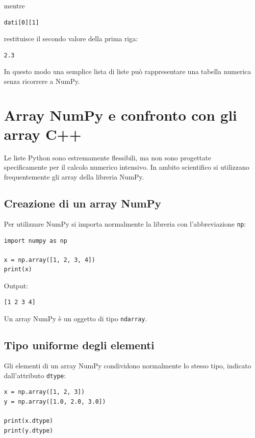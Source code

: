 \documentclass[11pt,a4paper]{book}
\begin{document}
mentre

\begin{lstlisting}[style=python]
dati[0][1]
\end{lstlisting}

restituisce il secondo valore della prima riga:

\begin{lstlisting}[style=output]
2.3
\end{lstlisting}

In questo modo una semplice lista di liste può rappresentare una tabella numerica senza ricorrere a NumPy.


\section{Array NumPy e confronto con gli array C++}

Le liste Python sono estremamente flessibili, ma non sono progettate specificamente per il calcolo numerico intensivo. In ambito scientifico si utilizzano frequentemente gli array della libreria NumPy.

\subsection{Creazione di un array NumPy}

Per utilizzare NumPy si importa normalmente la libreria con l'abbreviazione \texttt{np}:

\begin{lstlisting}[style=python]
import numpy as np

x = np.array([1, 2, 3, 4])
print(x)
\end{lstlisting}

Output:

\begin{lstlisting}[style=python, numbers=none]
[1 2 3 4]
\end{lstlisting}

Un array NumPy è un oggetto di tipo \texttt{ndarray}.

\subsection{Tipo uniforme degli elementi}

Gli elementi di un array NumPy condividono normalmente lo stesso tipo, indicato dall'attributo \texttt{dtype}:

\begin{lstlisting}[style=python]
x = np.array([1, 2, 3])
y = np.array([1.0, 2.0, 3.0])

print(x.dtype)
print(y.dtype)
\end{lstlisting}
\end{document}
